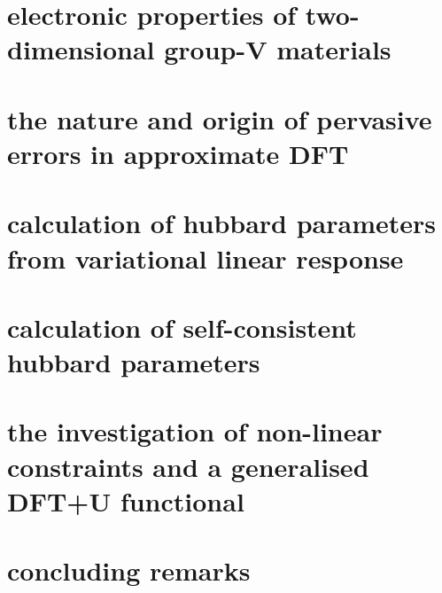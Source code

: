 \documentclass[twoside,12pt]{report}
\begin{document}
\chapter[{\sc electronic properties of two-dimensional \break group-V materials}]{\sc electronic properties of two-dimensional group-V materials}
\label{ch:elec_prop_2d_mater}


\clearpage\null\newpage
\chapter{\sc the nature and origin of pervasive errors in \break approximate DFT}
\label{ch:self_interaction_error}



\clearpage\null\newpage
\chapter{\sc calculation of hubbard parameters from \break variational linear response}
\label{ch:calculating_hubbard_u}


\clearpage\null\newpage
\chapter[\sc calculation of self-consistent hubbard \break parameters]{\sc calculation of self-consistent hubbard parameters}
\label{ch:self_consistent_hubbard}



\chapter[\sc the investigation of non-linear constraints and a \break generalised  DFT+U functional]{\sc the investigation of non-linear constraints and a generalised  DFT+U functional}
\label{ch:non_linear_constraints}


%
%
\chapter{\sc concluding remarks}
\label{ch:conclusions}



\clearpage\null\newpage
\appendix
\end{document}
